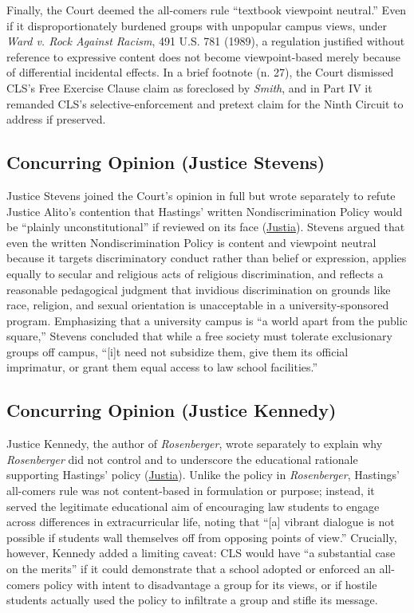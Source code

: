 \documentclass[12pt]{article}
\begin{document}
Finally, the Court deemed the all-comers rule ``textbook viewpoint neutral.'' Even if it disproportionately burdened groups with unpopular campus views, under \textit{Ward v. Rock Against Racism}, 491 U.S. 781 (1989), a regulation justified without reference to expressive content does not become viewpoint-based merely because of differential incidental effects. In a brief footnote (n. 27), the Court dismissed CLS's Free Exercise Clause claim as foreclosed by \textit{Smith}, and in Part IV it remanded CLS's selective-enforcement and pretext claim for the Ninth Circuit to address if preserved.

\subsection{Concurring Opinion (Justice Stevens)}

Justice Stevens joined the Court's opinion in full but wrote separately to refute Justice Alito's contention that Hastings' written Nondiscrimination Policy would be ``plainly unconstitutional'' if reviewed on its face (\href{https://supreme.justia.com/cases/federal/us/561/661/}{Justia}). Stevens argued that even the written Nondiscrimination Policy is content and viewpoint neutral because it targets discriminatory conduct rather than belief or expression, applies equally to secular and religious acts of religious discrimination, and reflects a reasonable pedagogical judgment that invidious discrimination on grounds like race, religion, and sexual orientation is unacceptable in a university-sponsored program. Emphasizing that a university campus is ``a world apart from the public square,'' Stevens concluded that while a free society must tolerate exclusionary groups off campus, ``[i]t need not subsidize them, give them its official imprimatur, or grant them equal access to law school facilities.''

\subsection{Concurring Opinion (Justice Kennedy)}

Justice Kennedy, the author of \textit{Rosenberger}, wrote separately to explain why \textit{Rosenberger} did not control and to underscore the educational rationale supporting Hastings' policy (\href{https://supreme.justia.com/cases/federal/us/561/661/}{Justia}). Unlike the policy in \textit{Rosenberger}, Hastings' all-comers rule was not content-based in formulation or purpose; instead, it served the legitimate educational aim of encouraging law students to engage across differences in extracurricular life, noting that ``[a] vibrant dialogue is not possible if students wall themselves off from opposing points of view.'' Crucially, however, Kennedy added a limiting caveat: CLS would have ``a substantial case on the merits'' if it could demonstrate that a school adopted or enforced an all-comers policy with intent to disadvantage a group for its views, or if hostile students actually used the policy to infiltrate a group and stifle its message.
\end{document}
